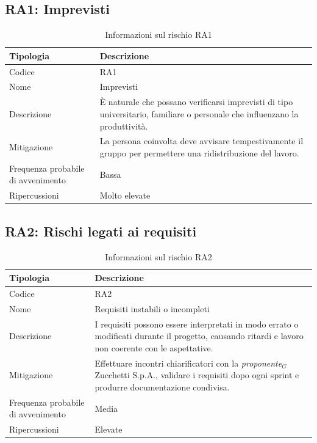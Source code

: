 \documentclass[a4paper, 11pt]{article}
\newcommand{\term}[1]{\textit{#1}$_G$} %
\begin{document}
\subsection{RA1: Imprevisti}
\begin{table}[H]
\centering
\begin{tabularx}{\textwidth}{|l|X|}
    \hline
    \textbf{Tipologia} & \textbf{Descrizione} \\ \hline
    Codice & RA1 \\ \hline
    Nome & Imprevisti \\ \hline
    Descrizione & È naturale che possano verificarsi imprevisti di tipo universitario, familiare o personale che influenzano la produttività. \\ \hline
    Mitigazione & La persona coinvolta deve avvisare tempestivamente il gruppo per permettere una ridistribuzione del lavoro. \\ \hline
    Frequenza probabile di avvenimento & Bassa \\ \hline
    Ripercussioni & Molto elevate \\ \hline
\end{tabularx}
\caption{Informazioni sul rischio RA1}
\end{table}

\subsection{RA2: Rischi legati ai requisiti}
\begin{table}[H]
\centering
\begin{tabularx}{\textwidth}{|l|X|}
    \hline
    \textbf{Tipologia} & \textbf{Descrizione} \\ \hline
    Codice & RA2 \\ \hline
    Nome & Requisiti instabili o incompleti \\ \hline
    Descrizione & I requisiti possono essere interpretati in modo errato o modificati durante il progetto, causando ritardi e lavoro non coerente con le aspettative. \\ \hline
    Mitigazione & Effettuare incontri chiarificatori con la \term{proponente} Zucchetti S.p.A., validare i requisiti dopo ogni sprint e produrre documentazione condivisa. \\ \hline
    Frequenza probabile di avvenimento & Media \\ \hline
    Ripercussioni & Elevate \\ \hline
\end{tabularx}
\caption{Informazioni sul rischio RA2}
\end{table}
\end{document}
